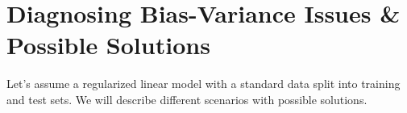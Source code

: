 \documentclass[english,nohyper,titlepage]{tufte-handout}
\begin{document}
\section{Diagnosing Bias-Variance Issues \& Possible Solutions}
Let's assume a regularized linear model with a standard data split into training and test sets.  We will describe different scenarios with possible solutions.

\end{document}
